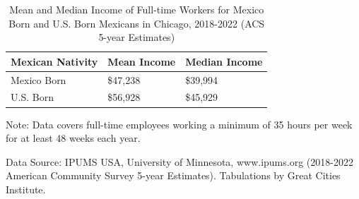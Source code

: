 \documentclass[
]{article}
\begin{document}
\begin{table}[H]
\centering
\begin{threeparttable}
\caption{\label{tab:unnamed-chunk-38}Mean and Median Income of Full-time Workers for Mexico Born and U.S. Born Mexicans in Chicago, 2018-2022 (ACS 5-year Estimates)}
\centering
\fontsize{8}{10}\selectfont
\begin{tabular}[t]{>{\raggedright\arraybackslash}p{14.2em}>{\raggedleft\arraybackslash}p{7.9em}>{\raggedleft\arraybackslash}p{7.9em}}
\toprule
\begingroup\fontsize{8}{10}\selectfont \textbf{Mexican Nativity}\endgroup & \begingroup\fontsize{8}{10}\selectfont \textbf{Mean Income}\endgroup & \begingroup\fontsize{8}{10}\selectfont \textbf{Median Income}\endgroup\\
\midrule
Mexico Born & \$47,238 & \$39,994\\
U.S. Born & \$56,928 & \$45,929\\
\bottomrule
\end{tabular}
\begin{tablenotes}
\small
\item [] \footnotesize{Note: Data covers full-time employees working a minimum of 35 hours per week for at least 48 weeks each year.}
\item [] \footnotesize{Data Source: IPUMS USA, University of Minnesota, www.ipums.org (2018-2022 American Community Survey 5-year Estimates). Tabulations by Great Cities Institute.}
\end{tablenotes}
\end{threeparttable}
\end{table}
\end{document}
